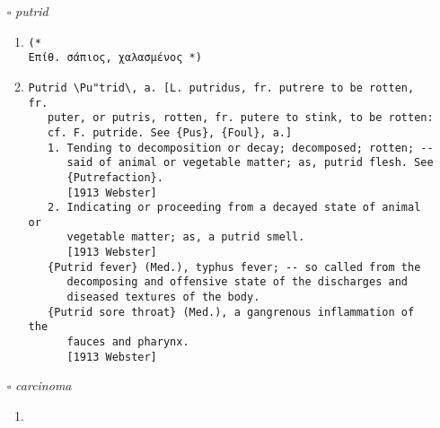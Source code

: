 \documentclass{article}
\begin{document}
\begin{itemize}
\begin{enumerate}
{\begin{lstlisting}
      [1913 Webster]
   2. Characterized by, or requiring, much sitting; as, a
      sedentary employment; a sedentary life.
      [1913 Webster]
            Any education that confined itself to sedentary
            pursuits was essentially imperfect.   --Beaconsfield.
      [1913 Webster]
   3. Inactive; motionless; sluggish; hence, calm; tranquil.
      [R.] ``The sedentary earth.'' --Milton.
      [1913 Webster]
            The soul, considered abstractly from its passions,
            is of a remiss, sedentary nature.     --Spectator.
      [1913 Webster]
   4. Caused by long sitting. [Obs.] ``Sedentary numbness.''
      --Milton.
      [1913 Webster]
   5. (Zo["o]l.) Remaining in one place, especially when firmly
      attached to some object; as, the oyster is a sedentary
      mollusk; the barnacles are sedentary crustaceans.
      [1913 Webster]
   {Sedentary spider} (Zo["o]l.), one of a tribe of spiders
      which rest motionless until their prey is caught in their
      web.
      [1913 Webster]
\end{lstlisting}}
\end{enumerate}
\item[$\square$] \emph{ putrid }
\begin{enumerate}
\item{
\begin{lstlisting}
(* 
Επίθ. σάπιος, χαλασμένος *)
\end{lstlisting}}
\item{
\begin{lstlisting}
Putrid \Pu"trid\, a. [L. putridus, fr. putrere to be rotten, fr.
   puter, or putris, rotten, fr. putere to stink, to be rotten:
   cf. F. putride. See {Pus}, {Foul}, a.]
   1. Tending to decomposition or decay; decomposed; rotten; --
      said of animal or vegetable matter; as, putrid flesh. See
      {Putrefaction}.
      [1913 Webster]
   2. Indicating or proceeding from a decayed state of animal or
      vegetable matter; as, a putrid smell.
      [1913 Webster]
   {Putrid fever} (Med.), typhus fever; -- so called from the
      decomposing and offensive state of the discharges and
      diseased textures of the body.
   {Putrid sore throat} (Med.), a gangrenous inflammation of the
      fauces and pharynx.
      [1913 Webster]
\end{lstlisting}}
\end{enumerate}
\item[$\square$] \emph{ carcinoma }
\begin{enumerate}
\item{
}
\end{enumerate}
\end{itemize}
\end{document}
